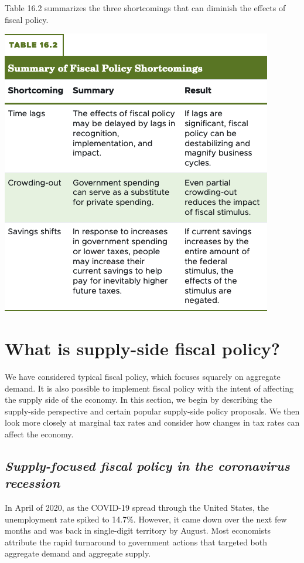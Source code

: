 \documentclass[11pt]{article} %
\begin{document}
Table 16.2 summarizes the three shortcomings that can diminish the effects of fiscal policy.

\begin{center}
\includegraphics[scale=0.5]{images/Table 16.2.png} 
\end{center}

\section*{What is supply-side fiscal policy?}
We have considered typical fiscal policy, which focuses squarely on aggregate demand. It is also possible to implement fiscal policy with the intent of affecting the supply side of the economy. In this section, we begin by describing the supply-side perspective and certain popular supply-side policy proposals. We then look more closely at marginal tax rates and consider how changes in tax rates can affect the economy.

\subsection*{\textbf{\textit{Supply-focused fiscal policy in the coronavirus recession}}}
In April of 2020, as the COVID-19 spread through the United States, the unemployment rate spiked to 14.7\%. However, it came down over the next few months and was back in single-digit territory by August. Most economists attribute the rapid turnaround to government actions that targeted both aggregate demand and aggregate supply.
\end{document}
